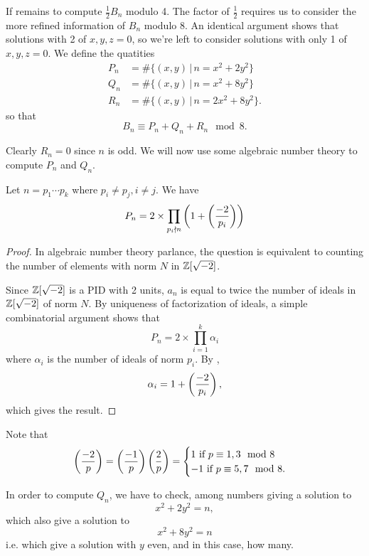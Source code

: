 \documentclass[12pt, a4paper]{amsart}
\begin{document}
If remains to compute $\frac{1}{2}B_n$ modulo 4. The factor of $\frac{1}{2}$
requires us to consider the more refined information of $B_n$ modulo 8.
An identical argument shows that solutions with 2 of $x,y,z = 0$, so
we're left to consider solutions with only 1 of $x,y,z = 0$.
We define the quatities
\[
  \begin{split}
    P_n &= \#\{(x,y) \,|\, n = x^2 + 2y^2\} \\
    Q_n &= \#\{(x,y) \,|\, n = x^2 + 8y^2\} \\
    R_n &= \#\{(x,y) \,|\, n = 2x^2 + 8y^2\}.
  \end{split}
\]
so that
\[
  B_n \equiv P_n + Q_n + R_n \mod{8}.
\]

Clearly $R_n = 0$ since $n$ is odd. We will now use some algebraic number theory
to compute $P_n$ and $Q_n$.

\begin{lemma}
  Let $n = p_1 \cdots p_k$ where $p_i \neq p_j, i \neq j$. We have
  \[P_n = 2 \times \prod\limits_{p_i \nmid n} \left( 1+ \left(\frac{-2}{p_i}\right) \right) \]
\end{lemma}

\begin{proof}
  In algebraic number theory parlance, the question is equivalent to counting
  the number of elements with norm $N$ in ${\mathbb Z}[\sqrt{-2}]$.

  Since ${\mathbb Z}[\sqrt{-2}]$ is a PID with 2 units, $a_n$ is equal to twice the
  number of ideals in ${\mathbb Z}[\sqrt{-2}]$ of norm $N$.
  By uniqueness of factorization of ideals, a simple combinatorial argument
  shows that
  \[P_n = 2 \times \prod\limits_{i=1}^k \alpha_i\]
  where $\alpha_i$ is the number of ideals of norm $p_i$.
  By \cite[Page 74, Theorem 25]{marcus},
  \[\alpha_i = 1 + \left(\frac{-2}{p_i}\right),\] which gives the result.
\end{proof}
\begin{remark}
  Note that \[\left(\frac{-2}{p}\right) = \left(\frac{-1}{p}\right) \left(\frac{2}{p}\right) = \begin{cases}
      1 \text{ if } p \equiv 1,3 \mod{8} \\
      -1 \text{ if } p \equiv 5,7 \mod{8}.
    \end{cases}\]
\end{remark}

In order to compute $Q_n$, we have to check, among numbers giving a solution to
\[x^2 + 2y^2 = n,\]
which also give a solution to
\[x^2 + 8y^2 = n\]
i.e. which give a solution with $y$ even, and in this case, how many.
\end{document}
